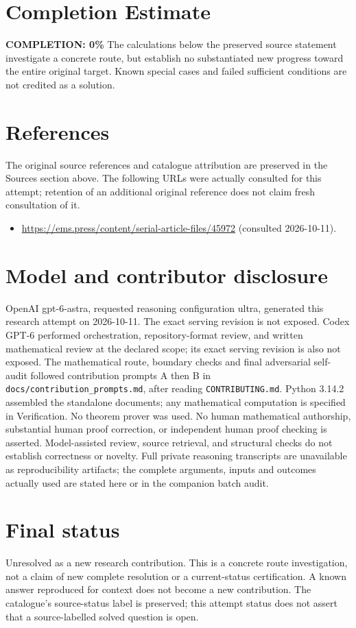 \documentclass[11pt]{article}
\begin{document}
\section{Completion Estimate}
\noindent\textbf{COMPLETION: 0\%}
The calculations below the preserved source statement investigate a concrete route,
but establish no substantiated new progress toward the entire original target.
Known special cases and failed sufficient conditions are not credited as a solution.
\section{References}
The original source references and catalogue attribution are preserved in the
Sources section above. The following URLs were actually consulted for this attempt;
retention of an additional original reference does not claim fresh consultation of it.
\begin{itemize}
\item \url{https://ems.press/content/serial-article-files/45972} (consulted 2026-10-11). 
\end{itemize}
\section{Model and contributor disclosure}
OpenAI gpt-6-astra, requested reasoning configuration ultra, generated this research
attempt on 2026-10-11. The exact serving revision is not exposed. Codex GPT-6
performed orchestration, repository-format review, and written mathematical review at the declared scope; its exact serving revision
is also not exposed. The mathematical route, boundary checks and final adversarial
self-audit followed contribution prompts A then B in
\texttt{docs/contribution\_prompts.md}, after reading \texttt{CONTRIBUTING.md}.
Python 3.14.2 assembled the standalone documents; any mathematical computation is
specified in Verification. No theorem prover was used. No human mathematical
authorship, substantial human proof correction, or independent human proof checking
is asserted. Model-assisted review, source retrieval, and structural checks do not
establish correctness or novelty. Full private reasoning transcripts are unavailable
as reproducibility artifacts; the complete arguments, inputs and outcomes actually
used are stated here or in the companion batch audit.
\section{Final status}
Unresolved as a new research contribution. This is a concrete route investigation,
not a claim of new complete resolution or a current-status certification. A known
answer reproduced for context does not become a new contribution. The catalogue's
source-status label is preserved; this attempt status does not assert that a
source-labelled solved question is open.
\end{document}
